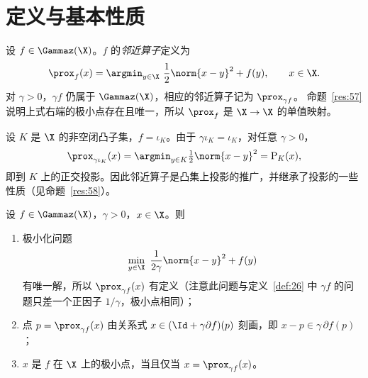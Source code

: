 \section{定义与基本性质}

\begin{definition}[邻近算子]
\label{def:26}
设 $f\in\Gammaz(\X)$。$f$ 的\emph{邻近算子}定义为
\[
  \prox_f(x)=\argmin_{y\in\X}\ \frac12\norm{x-y}^2+f(y),\qquad x\in\X .
\]
对 $\gamma>0$，$\gamma f$ 仍属于 $\Gammaz(\X)$，相应的邻近算子记为 $\prox_{\gamma f}$。
命题~\ref{res:57} 说明上式右端的极小点存在且唯一，所以 $\prox_f$ 是 $\X\to\X$ 的单值映射。
\end{definition}

\begin{example}[投影]
\label{exa:18}
设 $K$ 是 $\X$ 的非空闭凸子集，$f=\iota_K$。由于 $\gamma\iota_K=\iota_K$，对任意 $\gamma>0$，
\[
  \prox_{\gamma\iota_K}(x)=\argmin_{y\in K}\tfrac12\norm{x-y}^2=\mathrm P_K(x),
\]
即到 $K$ 上的正交投影。因此邻近算子是凸集上投影的推广，并继承了投影的一些性质（见命题~\ref{res:58}）。
\end{example}

\begin{proposition}
\label{res:57}
设 $f\in\Gammaz(\X)$，$\gamma>0$，$x\in\X$。则
\begin{enumerate}[label=(\roman*)]
  \item 极小化问题
  \[
    \min_{y\in\X}\ \frac1{2\gamma}\norm{x-y}^2+f(y)
  \]
  有唯一解，所以 $\prox_{\gamma f}(x)$ 有定义（注意此问题与定义~\ref{def:26} 中 $\gamma f$ 的问题只差一个正因子 $1/\gamma$，极小点相同）；
  \item 点 $p=\prox_{\gamma f}(x)$ 由关系式 $x\in(\Id+\gamma\partial f)(p)$ 刻画，即 $x-p\in\gamma\,\partial f(p)$；
  \item $x$ 是 $f$ 在 $\X$ 上的极小点，当且仅当 $x=\prox_{\gamma f}(x)$。
\end{enumerate}
\end{proposition}

